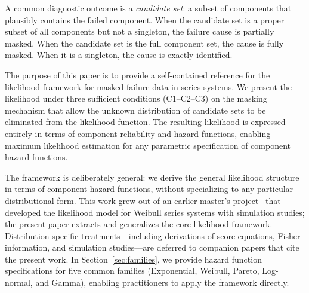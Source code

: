 \documentclass[11pt]{article}
\theoremstyle{definition}
\theoremstyle{plain}
\begin{document}
A common diagnostic outcome is a \emph{candidate set}: a subset of
components that plausibly contains the failed component.
When the candidate set is a proper subset of all components but not a
singleton, the failure cause is partially masked.
When the candidate set is the full component set, the cause is fully masked.
When it is a singleton, the cause is exactly identified.

The purpose of this paper is to provide a self-contained reference for
the likelihood framework for masked failure data in series systems.
We present the likelihood under three sufficient conditions
(C1--C2--C3) on the masking mechanism that allow the unknown distribution
of candidate sets to be eliminated from the likelihood function.
The resulting likelihood is expressed entirely in terms of component
reliability and hazard functions, enabling maximum likelihood estimation
for any parametric specification of component hazard functions.

The framework is deliberately general:
we derive the general likelihood structure in terms of component hazard
functions, without specializing to any particular distributional form.
This work grew out of an earlier master's
project~\citep{towell2023masters} that developed the likelihood model
for Weibull series systems with simulation studies; the present paper
extracts and generalizes the core likelihood framework.
Distribution-specific treatments---including derivations of score
equations, Fisher information, and simulation studies---are deferred to
companion papers that cite the present work.
In Section~\ref{sec:families}, we provide hazard function specifications
for five common families (Exponential, Weibull, Pareto, Log-normal,
and Gamma), enabling practitioners to apply the framework directly.
\end{document}
